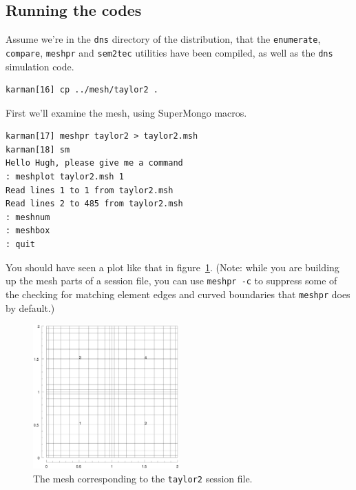 \documentclass[11pt,a4paper]{report}
\begin{document}
\subsection{Running the codes}

Assume we're in the \texttt{dns} directory of the distribution, that
the \texttt{enumerate}, \texttt{compare}, \texttt{meshpr} and
\texttt{sem2tec} utilities have been compiled, as well as the
\texttt{dns} simulation code.
{\small
\begin{verbatim}
karman[16] cp ../mesh/taylor2 .
\end{verbatim}
}

First we'll examine the mesh, using SuperMongo macros.
{\small
\begin{verbatim}
karman[17] meshpr taylor2 > taylor2.msh
karman[18] sm
Hello Hugh, please give me a command
: meshplot taylor2.msh 1
Read lines 1 to 1 from taylor2.msh
Read lines 2 to 485 from taylor2.msh
: meshnum
: meshbox
: quit
\end{verbatim}
}
\noindent
You should have seen a plot like that in figure~\ref{tay2msh}. (Note:
while you are building up the mesh parts of a session file, you can
use \texttt{meshpr -c} to suppress some of the checking for matching
element edges and curved boundaries that \texttt{meshpr} does by
default.)
\begin{figure}
\begin{center}
\includegraphics[width=0.5\textwidth]{taylor2mesh.eps}
\end{center}
\caption{
\label{tay2msh}
  The mesh corresponding to the \texttt{taylor2} session file.
}
\end{figure}
\end{document}
